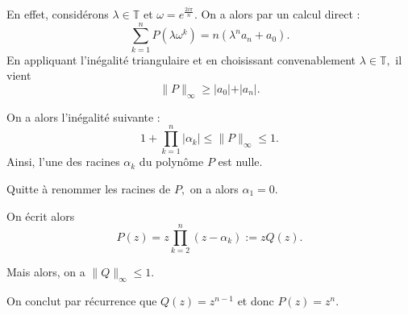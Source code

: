 En effet, considérons $\lambda\in\mathbb{T}$ et $\omega=e^{\frac{2i\pi}{n}}.$
On a alors par un calcul direct :  $$\sum_{k=1}^{n}P(\lambda\omega^{k})=n(\lambda^{n}a_{n}+a_{0}).$$
En appliquant l'inégalité triangulaire et en choisissant convenablement $\lambda\in\mathbb{T},$ il vient $$\|P\|_{\infty}\geq \vert a_{0} \vert + \vert a_{n}\vert.$$

On a alors l'inégalité suivante : $$ 1+\prod_{k=1}^{n}\vert \alpha_{k} \vert \leq \|P\|_{\infty} \leq 1.$$
Ainsi, l'une des racines $\alpha_{k}$ du polynôme $P$ est nulle.

Quitte à renommer les racines de $P,$ on a alors $\alpha_{1}=0.$ 

On écrit alors $$P(z)=z\prod_{k=2}^{n}(z-\alpha_{k}):=zQ(z).$$

Mais alors, on a $\displaystyle \|Q\|_{\infty}\leq 1.$

On conclut par récurrence que $Q(z)=z^{n-1}$ et donc $P(z)=z^{n}.$